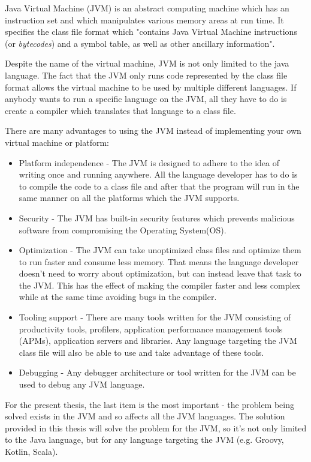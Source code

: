 \documentclass[..thesis.tex]{subfiles}
\begin{document}

Java Virtual Machine (JVM) is an abstract computing machine which has an instruction set and which manipulates various memory areas at run time.\cite{oracle_jvm_spec}
It specifies the class file format which "contains Java Virtual Machine instructions (or \textit{bytecodes}) and a symbol table, as well as other ancillary information"\cite{oracle_jvm_spec}.

Despite the name of the virtual machine, JVM is not only limited to the java language. 
The fact that the JVM only runs code represented by the class file format allows the virtual machine to be used by multiple different languages.
If anybody wants to run a specific language on the JVM, all they have to do is create a compiler which translates that language to a class file.

There are many advantages to using the JVM instead of implementing your own virtual machine or platform:

\begin{itemize}
  \item Platform independence - 
    The JVM is designed to adhere to the idea of writing once and running anywhere. 
    All the language developer has to do is to compile the code to a class file and after that the program will run in the same manner on all the platforms which the JVM supports.
  \item Security - 
    The JVM has built-in security features which prevents malicious software from compromising the Operating System(OS). 
  \item Optimization - 
    The JVM can take unoptimized class files and optimize them to run faster and consume less memory. 
    That means the language developer doesn't need to worry about optimization, but can instead leave that task to the JVM.
    This has the effect of making the compiler faster and less complex while at the same time avoiding bugs in the compiler.
  \item Tooling support -
    There are many tools written for the JVM consisting of productivity tools, profilers, application performance management tools (APMs), application servers and libraries. 
    Any language targeting the JVM class file will also be able to use and take advantage of these tools.
  \item Debugging - 
    Any debugger architecture or tool written for the JVM can be used to debug any JVM language.
\end{itemize}

For the present thesis, the last item is the most important - the problem being solved exists in the JVM and so affects all the JVM languages. 
The solution provided in this thesis will solve the problem for the JVM, so it's not only limited to the Java language, but for any language targeting the JVM (e.g. Groovy, Kotlin, Scala).
 
\end{document}

